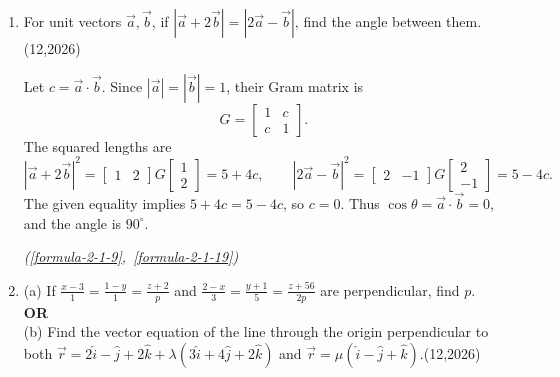 \begin{enumerate}[label={},font=\normalfont,leftmargin=1.15cm,labelwidth=1.0cm,labelsep=0.15cm,itemindent=0pt,listparindent=0pt,itemsep=\baselineskip,parsep=0pt,topsep=0pt]
\item[2.2.9] For unit vectors $\vec a,\vec b$, if $|\vec a+2\vec b|=|2\vec a-\vec b|$, find the angle between them.\nobreak\hfill\mbox{(12,2026)}



\vspace{0.6em}\par\solution


Let $c=\vec a\cdot\vec b$. Since $|\vec a|=|\vec b|=1$, their Gram matrix is
\[
G=\begin{bmatrix}1&c\\c&1\end{bmatrix}.
\]
The squared lengths are
\[
|\vec a+2\vec b|^2=
\begin{bmatrix}1&2\end{bmatrix}G\begin{bmatrix}1\\2\end{bmatrix}=5+4c,
\qquad
|2\vec a-\vec b|^2=
\begin{bmatrix}2&-1\end{bmatrix}G\begin{bmatrix}2\\-1\end{bmatrix}=5-4c.
\]
The given equality implies $5+4c=5-4c$, so $c=0$. Thus $\cos\theta=\vec a\cdot\vec b=0$, and the angle is $\boxed{90^\circ}$.\par\noindent\hfill\mbox{\textit{(\ref{formula-2-1-9}, \ref{formula-2-1-19})}}\par

\item[2.2.10]
(a) If $\frac{x-3}{1}=\frac{1-y}{1}=\frac{z+2}{p}$ and $\frac{2-x}{3}=\frac{y+1}{5}=\frac{z+56}{2p}$ are perpendicular, find $p$.\\
\textbf{OR}\\
(b) Find the vector equation of the line through the origin perpendicular to both $\vec r=2\hat i-\hat j+2\hat k+\lambda(3\hat i+4\hat j+2\hat k)$ and $\vec r=\mu(\hat i-\hat j+\hat k)$.\nobreak\hfill\mbox{(12,2026)}



\vspace{0.6em}\par\solution



\end{enumerate}
